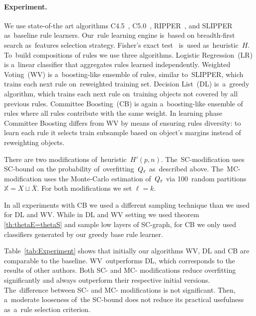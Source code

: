 \documentclass{article}
\let\cite\citep
\def\XX{\mathbb{X}}
\newcommand{\X}{\bar X}
\begin{document}
\paragraph{Experiment.}
We use state-of-the art algorithms
C4.5~\cite{quinlan96bagging},
C5.0~\cite{quinlan93programs},
\mbox{RIPPER}~\cite{cohen95fast}, and
\mbox{SLIPPER}~\cite{cohen99simple}
as~baseline rule learners.
Our~rule learning engine is~based on breadth-first search as~features selection strategy.
Fisher's exact test~\cite{martin97exact} is~used as~heuristic~$H$.
To~build compositions of rules we use three algorithms.
Logistic Regression~(LR) is a~linear classifier that aggregates rules learned independently.
Weighted Voting~(WV) is a~boosting-like ensemble of rules, similar to~\mbox{SLIPPER},
which trains each next rule on~reweighted training set.
Decision List~(DL) is~a~greedy algorithm,
which trains each next rule on~training objects not covered by all previous rules.
Committee Boosting~(CB) is again a~boosting-like ensemble of rules where all rules contribute with the same weight. 
In learning phase Committee Boosting differs from WV by means of ensuring rules diversity: 
to learn each rule it selects train subsample based on object's margins instead of reweighting objects.

There are two modifications of~heuristic~$H'(p,n)$.
The~SC-modification uses SC-bound on the probability of~overfitting~$Q_\varepsilon$ as~described above.
The~MC-modification uses the Monte-Carlo estimation of~$Q_\varepsilon$
via 100~random partitions $\XX = X\sqcup\X$.
For both modifications we set $\ell=k$.

In all experiments with CB we used a different sampling technique than we used for DL and WV.
While in DL and WV setting we used theorem \ref{th:thetaE=thetaS} and sample low layers of SC-graph,
for CB we only used classifiers generated by our greedy base rule learner.

Table~\ref{tab:Experiment} shows that
initially our algorithms WV, DL and CB are comparable to the baseline.
WV~outperforms DL, which corresponds to the results of other authors.
Both SC- and MC- modifications reduce overfitting significantly
and always outperform their respective initial versions.
The~difference between SC- and MC- modifications is not significant.
Then, a~moderate looseness of~the SC-bound does not reduce %
its practical usefulness as~a~rule selection criterion.
\end{document}

